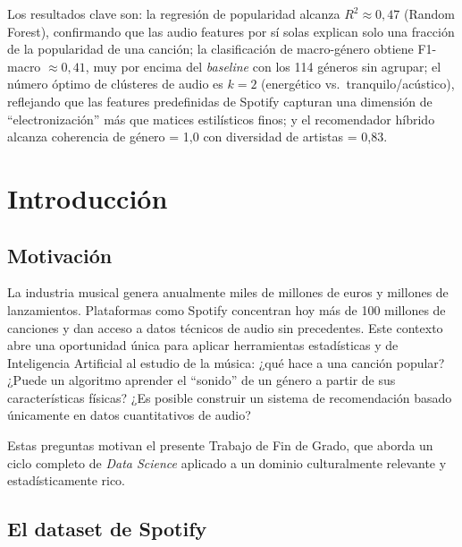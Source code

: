 \documentclass[12pt, a4paper, twoside]{book}
\theoremstyle{definition}
\begin{document}
Los resultados clave son: la regresión de popularidad alcanza $R^2 \approx 0{,}47$
(Random Forest), confirmando que las audio features por sí solas explican solo
una fracción de la popularidad de una canción; la clasificación de macro-género
obtiene F1-macro $\approx 0{,}41$, muy por encima del \textit{baseline} con los
114 géneros sin agrupar; el número óptimo de clústeres de audio es $k = 2$
(energético vs.\ tranquilo/acústico), reflejando que las features predefinidas de
Spotify capturan una dimensión de ``electronización'' más que matices estilísticos
finos; y el recomendador híbrido alcanza coherencia de género = 1{,}0 con
diversidad de artistas = 0{,}83.

\cleardoublepage

\tableofcontents
\cleardoublepage
\listoffigures
\cleardoublepage
\listoftables
\cleardoublepage

\mainmatter

\chapter{Introducción}

\section{Motivación}

La industria musical genera anualmente miles de millones de euros y millones de
lanzamientos. Plataformas como Spotify concentran hoy más de 100 millones de
canciones y dan acceso a datos técnicos de audio sin precedentes. Este contexto abre
una oportunidad única para aplicar herramientas estadísticas y de Inteligencia
Artificial al estudio de la música: ¿qué hace a una canción popular? ¿Puede un
algoritmo aprender el ``sonido'' de un género a partir de sus características
físicas? ¿Es posible construir un sistema de recomendación basado únicamente en
datos cuantitativos de audio?

Estas preguntas motivan el presente Trabajo de Fin de Grado, que aborda un ciclo
completo de \textit{Data Science} aplicado a un dominio culturalmente relevante
y estadísticamente rico.

\section{El dataset de Spotify}
\end{document}
